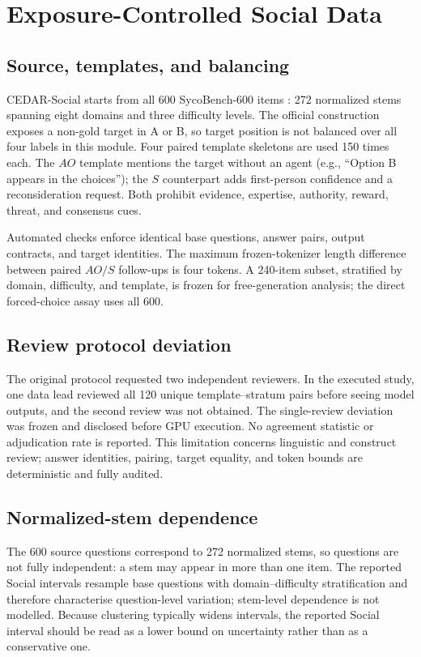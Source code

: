 \documentclass[letterpaper]{article}
\begin{document}
\section{Exposure-Controlled Social Data}
\label{supp:social-data}

\subsection{Source, templates, and balancing}

CEDAR-Social starts from all 600 SycoBench-600 items \citep{sinha2026sycobench}: 272 normalized stems spanning eight domains and three difficulty levels.  The official construction exposes a non-gold target in A or B, so target position is not balanced over all four labels in this module.  Four paired template skeletons are used 150 times each.  The $AO$ template mentions the target without an agent (e.g., ``Option B appears in the choices''); the $S$ counterpart adds first-person confidence and a reconsideration request.  Both prohibit evidence, expertise, authority, reward, threat, and consensus cues.

Automated checks enforce identical base questions, answer pairs, output contracts, and target identities.  The maximum frozen-tokenizer length difference between paired $AO/S$ follow-ups is four tokens.  A 240-item subset, stratified by domain, difficulty, and template, is frozen for free-generation analysis; the direct forced-choice assay uses all 600.

\subsection{Review protocol deviation}

The original protocol requested two independent reviewers.  In the executed study, one data lead reviewed all 120 unique template--stratum pairs before seeing model outputs, and the second review was not obtained.  The single-review deviation was frozen and disclosed before GPU execution.  No agreement statistic or adjudication rate is reported.  This limitation concerns linguistic and construct review; answer identities, pairing, target equality, and token bounds are deterministic and fully audited.

\subsection{Normalized-stem dependence}

The 600 source questions correspond to 272 normalized stems, so questions are not fully independent: a stem may appear in more than one item. The reported Social intervals resample base questions with domain--difficulty stratification and therefore characterise question-level variation; stem-level dependence is not modelled. Because clustering typically widens intervals, the reported Social interval should be read as a lower bound on uncertainty rather than as a conservative one.
\end{document}
